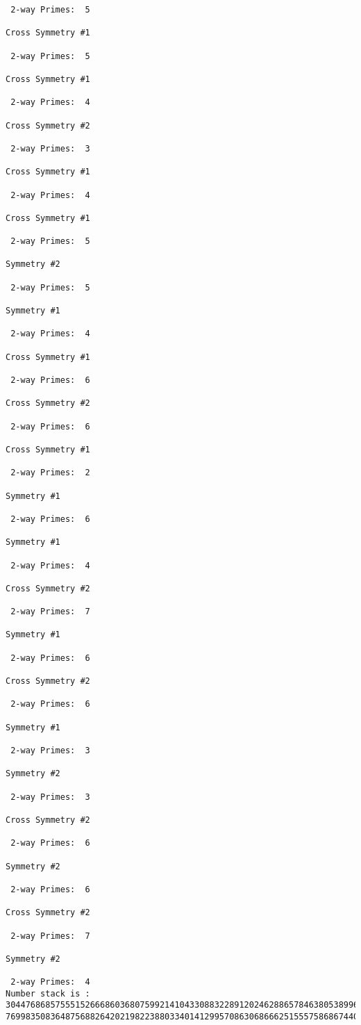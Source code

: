 \begin{verbatim}
 2-way Primes: 	5

Cross Symmetry #1

 2-way Primes: 	5

Cross Symmetry #1

 2-way Primes: 	4

Cross Symmetry #2

 2-way Primes: 	3

Cross Symmetry #1

 2-way Primes: 	4

Cross Symmetry #1

 2-way Primes: 	5

Symmetry #2

 2-way Primes: 	5

Symmetry #1

 2-way Primes: 	4

Cross Symmetry #1

 2-way Primes: 	6

Cross Symmetry #2

 2-way Primes: 	6

Cross Symmetry #1

 2-way Primes: 	2

Symmetry #1

 2-way Primes: 	6

Symmetry #1

 2-way Primes: 	4

Cross Symmetry #2

 2-way Primes: 	7

Symmetry #1

 2-way Primes: 	6

Cross Symmetry #2

 2-way Primes: 	6

Symmetry #1

 2-way Primes: 	3

Symmetry #2

 2-way Primes: 	3

Cross Symmetry #2

 2-way Primes: 	6

Symmetry #2

 2-way Primes: 	6

Cross Symmetry #2

 2-way Primes: 	7

Symmetry #2

 2-way Primes: 	4
Number stack is :
30447686857555152666860368075992141043308832289120246288657846380538996794608835958544046240163340857
76998350836487568826420219822388033401412995708630686662515557586867440375804336104264044585953880649


\end{verbatim}
